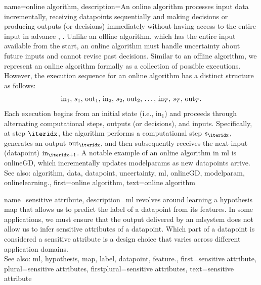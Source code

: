 {name={online algorithm},
	description={An online \gls{algorithm} processes input \gls{data} incrementally, 
		receiving \glspl{datapoint} sequentially and making decisions or producing \glspl{output} (or decisions) immediately 
		without having access to the entire input in advance \cite{PredictionLearningGames}, \cite{HazanOCO}. 
		Unlike an offline \gls{algorithm}, which has the entire input available from the start, an online \gls{algorithm} 
		must handle \gls{uncertainty} about future inputs and cannot revise past decisions. Similar to an 
		offline \gls{algorithm}, we represent an online \gls{algorithm} formally as a collection of possible 
		executions. However, the execution \gls{sequence} for an online \gls{algorithm} has a distinct structure as follows:
		$${\rm in}_{1}, \,s_1, \,{\rm out}_{1}, \,{\rm in}_{2}, \,s_2, \,{\rm out}_{2}, \,\ldots, \,{\rm in}_{T}, \,s_T, \,{\rm out}_{T}.$$ 
		Each execution begins from an initial state (i.e., \(\text{in}_{1}\)) and proceeds through alternating 
		computational steps, \glspl{output} (or decisions), and inputs. Specifically, at step \(\iteridx\), 
		the \gls{algorithm} performs a computational step \(s_{\iteridx}\), generates an \gls{output} \(\text{out}_{\iteridx}\), 
		and then subsequently receives the next input (\gls{datapoint}) \(\text{in}_{\iteridx+1}\). A 
		notable example of an online \gls{algorithm} in \gls{ml} is \gls{onlineGD}, which incrementally 
		updates \glspl{modelparam} as new \glspl{datapoint} arrive. 
					\\ 
		See also: \gls{algorithm}, \gls{data}, \gls{datapoint}, \gls{uncertainty}, \gls{ml}, \gls{onlineGD}, \gls{modelparam}, \gls{onlinelearning}.},
	first={online algorithm},
	text={online algorithm} 
}

{name={sensitive attribute},
	description={\gls{ml} revolves around learning a \gls{hypothesis} \gls{map} that allows 
		us to predict the \gls{label} of a \gls{datapoint} from its \glspl{feature}. In some 
		applications, we must ensure that the \gls{output} delivered by an \gls{mlsystem} does 
		not allow us to infer sensitive attributes of a \gls{datapoint}. Which part 
		of a \gls{datapoint} is considered a sensitive attribute is a design 
		choice that varies across different application domains.
					\\ 
		See also: \gls{ml}, \gls{hypothesis}, \gls{map}, \gls{label}, \gls{datapoint}, \gls{feature}.},
	first={sensitive attribute},
	plural={sensitive attributes},
	firstplural={sensitive attributes},
	text={sensitive attribute} 
}

